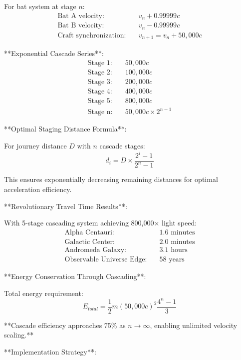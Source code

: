 \documentclass[12pt,a4paper]{article}
\theoremstyle{remark}
\begin{document}
For bat system at stage $n$:
\begin{align}
\text{Bat A velocity:} &\quad v_n + 0.99999c \\
\text{Bat B velocity:} &\quad v_n - 0.99999c \\
\text{Craft synchronization:} &\quad v_{n+1} = v_n + 50,000c
\end{align}

**Exponential Cascade Series**:
\begin{align}
\text{Stage 1:} &\quad 50,000c \\
\text{Stage 2:} &\quad 100,000c \\
\text{Stage 3:} &\quad 200,000c \\
\text{Stage 4:} &\quad 400,000c \\
\text{Stage 5:} &\quad 800,000c \\
\text{Stage n:} &\quad 50,000c \times 2^{n-1}
\end{align}

**Optimal Staging Distance Formula**:

For journey distance $D$ with $n$ cascade stages:
\begin{equation}
d_i = D \times \frac{2^i - 1}{2^n - 1}
\end{equation}

This ensures exponentially decreasing remaining distances for optimal acceleration efficiency.

**Revolutionary Travel Time Results**:

With 5-stage cascading system achieving 800,000× light speed:
\begin{align}
\text{Alpha Centauri:} &\quad 1.6 \text{ minutes} \\
\text{Galactic Center:} &\quad 2.0 \text{ minutes} \\
\text{Andromeda Galaxy:} &\quad 3.1 \text{ hours} \\
\text{Observable Universe Edge:} &\quad 58 \text{ years}
\end{align}

**Energy Conservation Through Cascading**:

Total energy requirement:
\begin{equation}
E_{total} = \frac{1}{2}m (50,000c)^2 \frac{4^n - 1}{3}
\end{equation}

**Cascade efficiency approaches 75\% as $n \rightarrow \infty$, enabling unlimited velocity scaling.**

**Implementation Strategy**:
\end{document}
